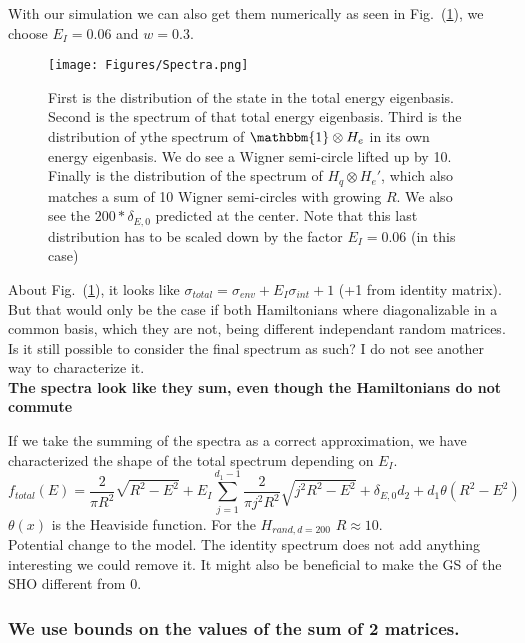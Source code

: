 \documentclass{article}
\begin{document}
With our simulation we can also get them numerically as seen in Fig.~(\ref{fig:spectra}), we choose $E_I=0.06$ and $w=0.3$.
\begin{figure}
    \centering
    \texttt{[image: Figures/Spectra.png]}
    \caption{First is the distribution of the state in the total energy eigenbasis. Second is the spectrum of that total energy eigenbasis. Third is the distribution of ythe spectrum of $\mathbbm{1}\otimes H_e$ in its own energy eigenbasis. We do see a Wigner semi-circle lifted up by 10. Finally is the distribution of the spectrum of $H_q\otimes H_e'$, which also matches a sum of 10 Wigner semi-circles with growing $R$. We also see the $200*\delta_{E,0}$ predicted at the center. Note that this last distribution has to be scaled down by the factor $E_I=0.06$ (in this case)}
    \label{fig:spectra}
\end{figure}

About Fig.~(\ref{fig:spectra}), it looks like $\sigma_{total}=\sigma_{env}+E_I\sigma_{int} + 1$ (+1 from identity matrix). But that would only be the case if both Hamiltonians where diagonalizable in a common basis, which they are not, being different independant random matrices. Is it still possible to consider the final spectrum as such? I do not see another way to characterize it.\\

{\color{teal} \textbf{The spectra look like they sum, even though the Hamiltonians do not commute}}

If we take the summing of the spectra as a correct approximation, we have characterized the shape of the total spectrum depending on $E_I$. 
\begin{equation}
    f_{total}(E) = \frac{2}{\pi R^2}\sqrt{R^2-E^2} + E_I\sum_{j=1}^{d_1-1}\frac{2}{\pi j^2R^2}\sqrt{j^2R^2-E^2} + \delta_{E,0}d_2 + d_1\theta(R^2-E^2)
\end{equation}
$\theta(x)$ is the Heaviside function. For the $H_{rand, d=200}$ $R\approx 10$.\\

Potential change to the model. The identity spectrum does not add anything interesting we could remove it. It might also be beneficial to make the GS of the SHO different from 0. 

\subsubsection{We use bounds on the values of the sum of 2 matrices.}
\end{document}
